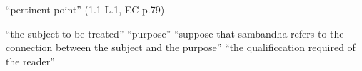 \documentclass[12pt]{article}
\begin{document}
\begin{multicols}{2}
\begin{enumerate}
		 ``pertinent point'' (1.1 L.1, EC p.79)
		\begin{enumerate}
			 ``the subject to be treated''
			 ``purpose''
			 ``suppose that sambandha refers to the connection between the subject and the purpose''
			 ``the qualificcation required of the reader''
		\end{enumerate}

	\end{enumerate}
\end{multicols}
\end{document}

